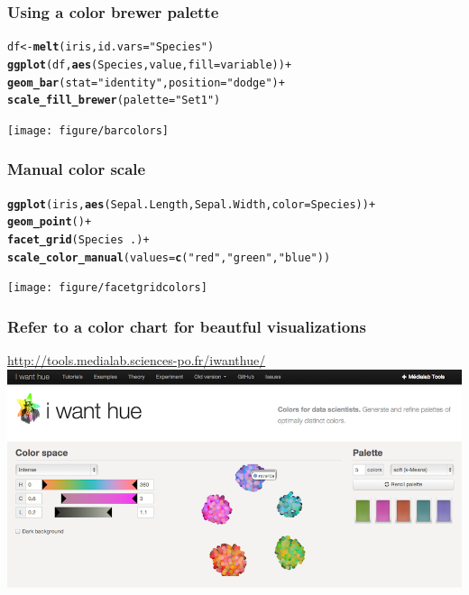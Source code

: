 \documentclass{beamer}\usepackage{graphicx, color}
\makeatletter
\newcommand{\hlfunctioncall}[1]{\textcolor[rgb]{0.501960784313725,0,0.329411764705882}{\textbf{#1}}}%
\newcommand{\hlstring}[1]{\textcolor[rgb]{0.6,0.6,1}{#1}}%
\newenvironment{kframe}{%
 \def\at@end@of@kframe{}%
 \ifinner\ifhmode%
  \def\at@end@of@kframe{\end{minipage}}%
  \begin{minipage}{\columnwidth}%
 \fi\fi%
 \def\FrameCommand##1{\hskip\@totalleftmargin \hskip-\fboxsep
 \colorbox{shadecolor}{##1}\hskip-\fboxsep
     \hskip-\linewidth \hskip-\@totalleftmargin \hskip\columnwidth}%
 \MakeFramed {\advance\hsize-\width
   \@totalleftmargin\z@ \linewidth\hsize
   \@setminipage}}%
 {\par\unskip\endMakeFramed%
 \at@end@of@kframe}
\newenvironment{knitrout}{}{} %
\makeatother
\begin{document}
\begin{frame}[fragile]
\frametitle{Using a color brewer palette}
\begin{knitrout}\footnotesize
{}\color{fgcolor}\begin{kframe}
\begin{alltt}
df  <- \hlfunctioncall{melt}(iris, id.vars = \hlstring{"Species"})
\hlfunctioncall{ggplot}(df, \hlfunctioncall{aes}(Species, value, fill = variable)) +
\hlfunctioncall{geom_bar}(stat = \hlstring{"identity"}, position = \hlstring{"dodge"}) +
\hlfunctioncall{scale_fill_brewer}(palette = \hlstring{"Set1"})
\end{alltt}
\end{kframe}
\texttt{[image: figure/barcolors]} 

\end{knitrout}

\end{frame}

\begin{frame}[fragile]
\frametitle{Manual color scale}
\begin{knitrout}\footnotesize
{}\color{fgcolor}\begin{kframe}
\begin{alltt}
\hlfunctioncall{ggplot}(iris, \hlfunctioncall{aes}(Sepal.Length, Sepal.Width, color = Species)) +
\hlfunctioncall{geom_point}() +
\hlfunctioncall{facet_grid}(Species ~ .) +
\hlfunctioncall{scale_color_manual}(values = \hlfunctioncall{c}(\hlstring{"red"}, \hlstring{"green"}, \hlstring{"blue"}))
\end{alltt}
\end{kframe}
\texttt{[image: figure/facetgridcolors]} 

\end{knitrout}

\end{frame}

\begin{frame}[fragile]
\frametitle{Refer to a color chart for beautful visualizations}
\url{http://tools.medialab.sciences-po.fr/iwanthue/}
\includegraphics[scale=0.25]{images/color_schemes.png}
\end{frame}
\end{document}
